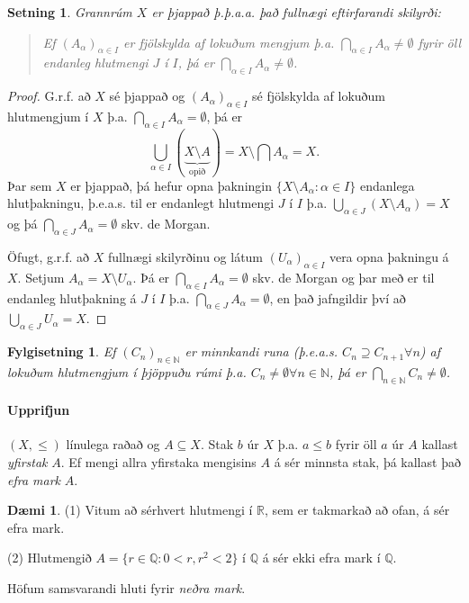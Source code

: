 \documentclass[a4paper,icelandic]{book}
\theoremstyle{definition}
\newtheorem{daemi}{Dæmi}[section]
\theoremstyle{plain}
\newtheorem{setn}{Setning}[section]
\newtheorem{fylgisetn}{Fylgisetning}[section]
\theoremstyle{remark}
\newcommand{\R}{\mathbb{R}} %
\newcommand{\N}{\mathbb{N}} %
\newcommand{\Q}{\mathbb{Q}} %
\begin{document}
\begin{setn}
  Grannrúm $X$ er þjappað \emph{þ.þ.a.a.} það fullnægi eftirfarandi
  skilyrði:
  \begin{quote}
    Ef $(A_\alpha)_{\alpha\in I}$ er fjölskylda af lokuðum mengjum
    þ.a. $\bigcap_{\alpha\in I} A_\alpha \neq\emptyset$ fyrir öll
    endanleg hlutmengi $J$ í $I$, þá er $\bigcap_{\alpha\in
      I}A_\alpha\neq \emptyset$.
  \end{quote}
\end{setn}
\begin{proof}
  G.r.f. að $X$ sé þjappað og $(A_\alpha)_{\alpha\in I}$ sé fjölskylda
  af lokuðum hlutmengjum í $X$ þ.a. $\bigcap_{\alpha\in I} A_\alpha =
  \emptyset$, þá er \[
  \bigcup_{\alpha\in I}(\underbrace{X\setminus A}_\text{opið})
  = X\setminus \bigcap A_\alpha
  = X.
  \]
  Þar sem $X$ er þjappað, þá hefur opna þakningin $\{X\setminus
  A_\alpha : \alpha\in I\}$ endanlega hlutþakningu, þ.e.a.s. til er
  endanlegt hlutmengi $J$ í $I$ þ.a. $\bigcup_{\alpha\in J}(X\setminus
  A_\alpha) = X$ og þá $\bigcap_{\alpha\in J} A_\alpha = \emptyset$
  skv. de Morgan.

  Öfugt, g.r.f. að $X$ fullnægi skilyrðinu og látum
  $(U_\alpha)_{\alpha\in I}$ vera opna þakningu á $X$. Setjum
  $A_\alpha = X\setminus U_\alpha$. Þá er $\bigcap_{\alpha\in
    I}A_\alpha=\emptyset$ skv. de Morgan og þar með er til endanleg
  hlutþakning á $J$ í $I$ þ.a. $\bigcap_{\alpha\in J}A_\alpha =
  \emptyset$, en það jafngildir því að $\bigcup_{\alpha\in J} U_\alpha
  = X$.
\end{proof}
\begin{fylgisetn}
  Ef $(C_n)_{n\in\N}$ er minnkandi runa (þ.e.a.s. $C_n\supseteq
  C_{n+1}\forall n$) af lokuðum hlutmengjum í þjöppuðu rúmi
  þ.a. $C_n\neq\emptyset\forall n\in\N$, þá er $\bigcap_{n\in\N}
  C_n\neq\emptyset$.
\end{fylgisetn}

\paragraph{Upprifjun}
$(X,\leq)$ línulega raðað og $A\subseteq X$. Stak $b$ úr $X$ þ.a. $a\leq
b$ fyrir öll $a$ úr $A$ kallast \emph{yfirstak} $A$.
Ef mengi allra yfirstaka mengisins $A$ á sér minnsta stak, þá kallast
það \emph{efra mark} $A$.
\begin{daemi}
  (1) Vitum að sérhvert hlutmengi í $\R$, sem er takmarkað að ofan, á
  sér efra mark.

  (2) Hlutmengið $A = \{r\in\Q : 0<r, r^2 < 2\}$ í $\Q$ á sér ekki efra
  mark í $\Q$.
\end{daemi}
Höfum samsvarandi hluti fyrir \emph{neðra mark}.
\end{document}
